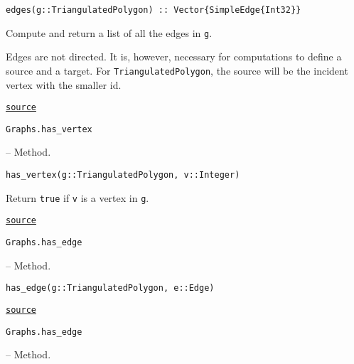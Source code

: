 \begin{adjustwidth}{2em}{0pt}


\begin{verbatim}
edges(g::TriangulatedPolygon) :: Vector{SimpleEdge{Int32}}
\end{verbatim}

Compute and return a list of all the edges in \texttt{g}.

Edges are not directed. It is, however, necessary for computations to define a source and a target.  For \texttt{TriangulatedPolygon}, the source will be the incident vertex with the smaller id.



\href{https://github.com/schto223/FlipGraphs.jl/blob/e35d43698a06b86273148826b79d585ba04fcd26/src/polygonTriangulations.jl#L63-L70}{\texttt{source}}


\end{adjustwidth}
\hypertarget{11099834342798379214}{\texttt{Graphs.has\_vertex}}  -- {Method.}

\begin{adjustwidth}{2em}{0pt}


\begin{verbatim}
has_vertex(g::TriangulatedPolygon, v::Integer)
\end{verbatim}

Return \texttt{true} if \texttt{v} is a vertex in \texttt{g}. 



\href{https://github.com/schto223/FlipGraphs.jl/blob/e35d43698a06b86273148826b79d585ba04fcd26/src/polygonTriangulations.jl#L88-L92}{\texttt{source}}


\end{adjustwidth}
\hypertarget{14090102072355441192}{\texttt{Graphs.has\_edge}}  -- {Method.}

\begin{adjustwidth}{2em}{0pt}


\begin{verbatim}
has_edge(g::TriangulatedPolygon, e::Edge)
\end{verbatim}



\href{https://github.com/schto223/FlipGraphs.jl/blob/e35d43698a06b86273148826b79d585ba04fcd26/src/polygonTriangulations.jl#L77-L79}{\texttt{source}}


\end{adjustwidth}
\hypertarget{9162594476608360322}{\texttt{Graphs.has\_edge}}  -- {Method.}


